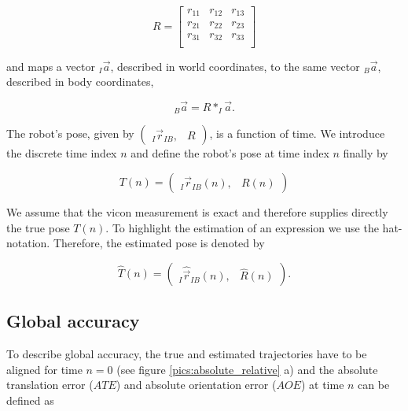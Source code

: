 \begin{equation}
       R = \left[ \begin{array}{ccc}
		r_{11} & r_{12}	& r_{13} \\
		r_{21} & r_{22} 	& r_{23} \\
		r_{31} & r_{32}	& r_{33} \\
		\end{array} \right]
\end{equation}

and maps a vector $_I \vec{a} $, described in world coordinates, to the same vector $_B \vec{a} $, described in body coordinates,

\begin{equation}
	_B \vec{a} = R * _I \vec{a} .
\end{equation}


The robot's pose, given by $ \left( \begin{array}{cc} _I \vec{r}_{IB}, & R \end{array} \right) $, is a function of time. We introduce the discrete time index $n$ and define the robot's pose at time index $n$ finally by 

\begin{equation}
	T(n) = \left( \begin{array}{cc} _I \vec{r}_{IB}(n), & R(n) \end{array} \right)
\end{equation}

We assume that the vicon measurement is exact and therefore supplies directly the true pose $T(n)$. To highlight the estimation of an expression we use the hat-notation. Therefore, the estimated pose is denoted by

\begin{equation}
	\hat{T}(n) = \left( \begin{array}{cc} _I \hat{\vec{r}}_{IB}(n), & \hat{R}(n) \end{array} \right) .
\end{equation}


\subsection{Global accuracy}
\label{sec:global}

To describe global accuracy, the true and estimated trajectories have to be aligned for time $n=0$ (see figure \ref{pics:absolute_relative} a) and the absolute translation error ($ATE$) and absolute orientation error ($AOE$) at time $n$ can be defined as

